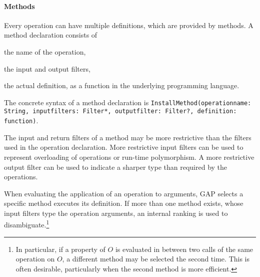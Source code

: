 \paragraph{Methods}
Every operation can have multiple definitions, which are provided by methods.
A method declaration consists of
\begin{compactitem}
  \item the name of the operation,
  \item the input and output filters,
  \item the actual definition, as a function in the underlying programming language.
\end{compactitem}

The concrete syntax of a method declaration is
\lstinline|InstallMethod(operationname: String, inputfilters: Filter*, outputfilter: Filter?, definition: function)|.

The input and return filters of a method may be more restrictive than the filters used in the operation declaration.
More restrictive input filters can be used to represent overloading of operations or run-time polymorphism.
A more restrictive output filter can be used to indicate a sharper type than required by the operations.

When evaluating the application of an operation to arguments, GAP selects a specific method executes its definition.
If more than one method exists, whose input filters type the operation arguments, an internal ranking is used to disambiguate.\footnote{In particular, if a property of $O$ is evaluated in between two calls of the same operation on $O$, a different method may be selected the second time. This is often desirable, particularly when the second method is more efficient.}

%
%
%
%
